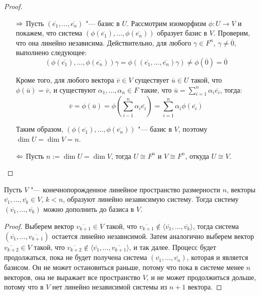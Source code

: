     \begin{proof}~
    	\begin{itemize}
    		\item[$\Rightarrow$] Пусть $(\overline{e_1}, \dots, \overline{e_n})$ "--- базис в $U$. Рассмотрим изоморфизм $\phi : U \rightarrow V$ и покажем, что система $(\phi(\overline{e_1}), \dots, \phi(\overline{e_n}))$ образует базис в $V$. Проверим, что она линейно независима. Действительно, для любого $\gamma \in F^n$, $\gamma \ne \overline{0}$, выполнено следующее:
    		\[(\phi(\overline{e_1}), \dots, \phi(\overline{e_n}))\gamma = \phi((\overline{e_1}, \dots, \overline{e_n})\gamma) \ne \phi(\overline{0}) = \overline{0}\]
    		
    		Кроме того, для любого вектора $\overline{v} \in V$ существует $\overline{u} \in U$ такой, что $\phi(\overline{u}) = \overline{v}$, и существуют $\alpha_1, \dotsc, \alpha_n \in F$ такие, что $\overline{u} = \sum_{i = 1}^{n}\alpha_i\overline{e_i}$, тогда:
    		\[\overline{v} = \phi(\overline{u}) = \phi\left(\sum_{i - 1}^{n}\alpha_i\overline{e_i}\right) = \sum_{i = 1}^{n}\alpha_i\phi(\overline{e_i})\]
    		
    		Таким образом, $(\phi(\overline{e_1}), \dots, \phi(\overline{e_n}))$ "--- базис в $V$, поэтому $\dim{U} = \dim{V} = n$.
    		
    		\item[$\Leftarrow$] Пусть $n := \dim{U} = \dim{V}$, тогда $U \cong F^n$ и $V \cong F^n$, откуда $U \cong V$.\qedhere
    	\end{itemize}
    \end{proof}
    
    \begin{proposition}
    	Пусть $V$ "--- конечнопорожденное линейное пространство размерности $n$, векторы $\overline{v_1}, \dots, \overline{v_k} \in V$, $k < n$, образуют линейно независимую систему. Тогда систему $(\overline{v_1}, \dots, \overline{v_k})$ можно дополнить до базиса в $V$.
    \end{proposition}
    
    \begin{proof}
    	Выберем вектор $\overline{v_{k+1}} \in V$ такой, что $\overline{v_{k+1}} \not\in \langle\overline{v_1}, \dots, \overline{v_k}\rangle$, тогда система $(\overline{v_1}, \dots, \overline{v_{k+1}})$ остается линейно независимой. Затем аналогично выберем вектор $\overline{v_{k+2}} \in V$ такой, что $\overline{v_{k+2}} \not\in \langle\overline{v_1}, \dots, \overline{v_{k+1}}\rangle$, и так далее. Процесс будет продолжаться, пока не будет получена система $(\overline{v_1}, \dots, \overline{v_n})$, которая и является базисом. Он не может остановиться раньше, потому что пока в системе менее $n$ векторов, она не выражает все пространство $V$, и не может продолжиться дольше, потому что в $V$ нет линейно независимой системы из $n + 1$ вектора.
    \end{proof}
    
